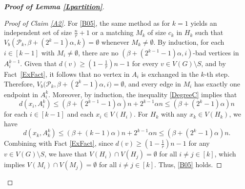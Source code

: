 \documentclass[11pt, a4paper]{article}
\theoremstyle{definition}
\newcommand{\<}{\subseteq}
\begin{document}
\begin{proof}[\bf Proof of Lemma \ref{Lpartition}]
\begin{proof}[Proof of Claim \ref{A2}]
For \ref{B05}, the same method as for $k=1$ yields an independent set of size $\frac{n}{r}+1$ or a 
matching $M_k$ of size $c_k$ in $H_k$ such that $V_b(\mathcal{P}_k, \beta+(2^k-1)\alpha, k) = \emptyset$ whenever $M_k\neq \emptyset$. By induction, for each $i \in [k-1]$ with $M_i \ne \emptyset$, there are no $(\beta +(2^{k-1}-1)\alpha,i)$-bad vertices in $A_{i}^{k-1}$. Given that \( d(v) \ge \left(1 - \frac{1}{r}\right)n - 1 \) for every \( v \in V(G) \setminus S \), and by Fact~\ref{ExFact}, it follows that no vertex  in \(A_i \) is exchanged in the \( k \)-th step. Therefore, \( V_b\bigl(\mathcal{P}_k, \beta + (2^k - 1)\alpha, i\bigr) = \emptyset \), and every edge in \( M_i \) has exactly one endpoint in \( A_i^k \). %
Moreover, by induction, the inequality \eqref{DegreeC} implies that 
$$d(x_i,A^k_i)\le (\beta+(2^{k-1}-1)\alpha)n+2^{k-1}\alpha n\le (\beta+(2^k-1)\alpha) n$$ 
for each $i \in [k-1]$ and each $x_i\in V(H_i)$. For $H_k$ with any $x_k\in V(H_k)$, we have 
$$d(x_k,A^k_k)\le (\beta+(k-1)\alpha)n+2^{k-1}\alpha n\le (\beta+(2^k-1)\alpha )n.$$
Combining with Fact \ref{ExFact}, since $d(v)\ge (1-\frac{1}{r})n-1$ for any $v\in V(G)\setminus S$, we have that $V(H_i)\cap V(H_j)=\emptyset$ for all $i\ne j\in [k]$, which implies  $V(M_i)\cap V(M_j)=\emptyset$ for all $i\ne j\in [k]$. Thus, \ref{B05} holds.


\end{proof}
\end{proof}
\end{document}
